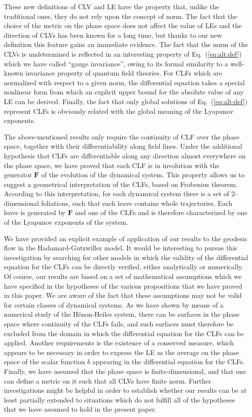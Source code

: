 \documentclass{article}
\theoremstyle{plain}
\theoremstyle{definition}
\theoremstyle{remark}
\newcommand{\vect}[1]{\boldsymbol{#1}}
\begin{document}
These new definitions of CLV and LE have the property that,
unlike the traditional ones, they do not rely upon the concept
of norm. The fact that the choice of the metric on the phase space
does not affect the
value of LEs and the direction of CLVs has been known for a
long time, but thanks to our new definition this feature gains
an immediate evidence. The fact that the norm of the CLVs
is undetermined is reflected in an interesting 
property of Eq.~(\ref{eq:alt:def}) which we have called ``gauge
invariance'', owing to its formal similarity to a well-known invariance
property of quantum field theories. For CLFs
which are normalized with respect to a given norm, the differential 
equation takes a special nonlinear form from which an explicit upper bound
for the absolute value of any LE can be derived.
Finally, the fact that
only global solutions of Eq.~(\ref{eq:alt:def}) represent CLFs
is  obviously related with the global
meaning of the Lyapunov exponents.

The above-mentioned results only require the continuity of CLF
over the phase space, together with their differentiability along
field lines. 
Under the additional hypothesis that CLFs are  differentiable 
along any direction
almost everywhere on the phase space, we
have proved that each CLF is in involution with the generator
$\vect{F}$ of the evolution of the dynamical system. This property
allows us to suggest a geometrical interpretation of the CLFs, 
based on Frobenius theorem. According to this interpretation,
for each dynamical system there is a set of 
2-dimensional foliations, such
that each leave contains whole trajectories. Each leave is
generated by $\vect{F}$ and one of the CLFs and is therefore
characterized by one of the Lyapunov exponents of the system.

We have provided an explicit example of application of our results
to the geodesic flow in the Hadamard-Gutzwiller model. It would be
interesting to pursue this investigation by searching for
other models in which the validity of the differential
equation for the CLFs can be directly verified, 
either analytically or numerically. Of course, our results are based
on a set of mathematical assumptions which we have specified in the
hypotheses of the various propositions that we have proved in this paper.
We are aware of the fact that these assumptions may not be valid for
certain classes of dynamical systems. As we have shown by means of a
numerical study of the H\'enon-Heiles system, there can be surfaces
in the phase space where continuity of the CLFs fails, and such surfaces must therefore
be excluded from the domain in which the differential equation for the CLFs can be
applied. Another requirements is the existence of a conserved measure, which
appears to be necessary in order to express the LE as the average on the phase space
of the scalar function $b$ appearing in the differential equation for the CLFs.
Finally, we have assumed that the phase space is finite-dimensional, and that
one can define  a metric on it such that all CLVs have finite norm.
Further investigations might be helpful in order to establish whether our results
can be at least partially extended to situations which do not fulfill all of the hypotheses
that we have assumed to hold in the present paper.
\end{document}
